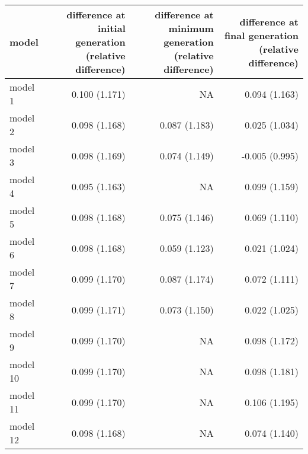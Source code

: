 \begin{tabular}{l r r r}
\hline
model & difference at initial generation (relative difference) & difference at minimum generation (relative difference) & difference at final generation (relative difference)\\
\hline
model 1 & 0.100 (1.171) & NA & 0.094 (1.163)\\
model 2 & 0.098 (1.168) & 0.087 (1.183) & 0.025 (1.034)\\
model 3 & 0.098 (1.169) & 0.074 (1.149) & -0.005 (0.995)\\
model 4 & 0.095 (1.163) & NA & 0.099 (1.159)\\
model 5 & 0.098 (1.168) & 0.075 (1.146) & 0.069 (1.110)\\
model 6 & 0.098 (1.168) & 0.059 (1.123) & 0.021 (1.024)\\
model 7 & 0.099 (1.170) & 0.087 (1.174) & 0.072 (1.111)\\
model 8 & 0.099 (1.171) & 0.073 (1.150) & 0.022 (1.025)\\
model 9 & 0.099 (1.170) & NA & 0.098 (1.172)\\
model 10 & 0.099 (1.170) & NA & 0.098 (1.181)\\
model 11 & 0.099 (1.170) & NA & 0.106 (1.195)\\
model 12 & 0.098 (1.168) & NA & 0.074 (1.140)\\
\hline
\end{tabular}